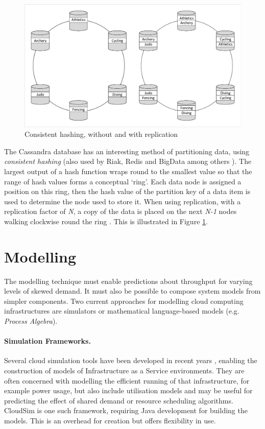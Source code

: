 \documentclass[runningheads]{llncs}
\begin{document}
\begin{figure}
	\centering
	\includegraphics[trim = 5 5 5 5, clip, width=\textwidth]{img/dbdist}
	\caption{Consistent hashing, without and with replication}
	\label{figure:consistent_hashing}
\end{figure}
\FloatBarrier
The Cassandra database has an interesting method of partitioning data, using {\itshape consistent hashing} (also used by Riak, Redis and BigData among others \cite{RN66}).  The largest output of a hash function wraps round to the smallest value so that the range of hash values forms a conceptual `ring'.  Each data node is assigned a position on this ring, then the hash value of the partition key of a data item is used to determine the node used to store it.  When using replication, with a replication factor of {\itshape N}, a copy of the data is placed on the next {\itshape N-1} nodes walking clockwise round the ring \cite{RN1050}.  This is illustrated in Figure \ref{figure:consistent_hashing}.

\section{Modelling}\label{sec:modelling}

The modelling technique must enable predictions about throughput for varying levels of skewed demand.  It must also be possible to compose system models from simpler components.  Two current approaches for modelling cloud computing infrastructures are simulators or mathematical language-based models (e.g. {\itshape Process Algebra}).

\paragraph{Simulation Frameworks.} Several cloud simulation tools have been developed in recent years \cite{RN1081}, enabling the construction of models of Infrastructure as a Service environments.  They are often concerned with modelling the efficient running of that infrastructure, for example power usage, but also include utilisation models and may be useful for predicting the effect of shared demand or resource scheduling algorithms.  CloudSim \cite{RN69} is one such framework, requiring Java development for building the models.  This is an overhead for creation but offers flexibility in use.
\end{document}
